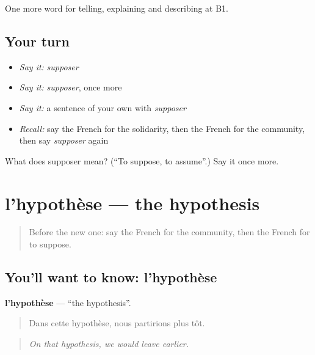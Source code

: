 \begin{grammarlens}[title={What you've built}]
One more word for telling, explaining and describing at B1.
\end{grammarlens}

\subsection*{Your turn}
\begin{itemize}
\raggedright
  \item \emph{Say it:} \emph{supposer}
  \item \emph{Say it:} \emph{supposer}, once more
  \item \emph{Say it:} a sentence of your own with \emph{supposer}
  \item \emph{Recall:} say the French for the solidarity, then the French for the community, then say \emph{supposer} again
\end{itemize}

\begin{tcolorbox}[breakable,colback=teal!4,colframe=teal!35!black,title={Before you move on}]
What does supposer mean? (\textquotedblleft{}To suppose, to assume\textquotedblright{}.) Say it once more.
\end{tcolorbox}
\section[l'hypothèse]{l'hypothèse — the hypothesis}

\label{lesson:FR-C367-hypothese}



\begin{quote}
Before the new one: say the French for the community, then the French for to suppose.
\end{quote}

\subsection*{You'll want to know: l'hypothèse}
\textbf{l'hypothèse} — \textquotedblleft{}the hypothesis\textquotedblright{}.

\begin{quote}
Dans cette hypothèse, nous partirions plus tôt.
\end{quote}

\begin{quote}
\emph{On that hypothesis, we would leave earlier.}
\end{quote}

